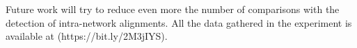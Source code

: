 \documentclass{llncs}
\begin{document}
Future work will try to reduce even more the number of comparisons with the detection of intra-network alignments. All the data gathered in the experiment is available at (https://bit.ly/2M3jIYS).

\end{document}
